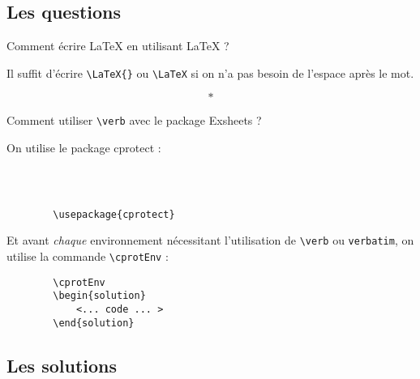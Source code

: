 \documentclass[french,11pt]{report}
\begin{document}
\ReglePied
\entete{}{}{}



\subsection*{Les questions}
\begin{question}
Comment écrire \LaTeX{} en utilisant \LaTeX{} ?
\end{question}

\cprotEnv
\begin{solution}
Il suffit d'écrire \verb=\LaTeX{}= ou \verb!\LaTeX! si on n'a pas besoin de l'espace après le mot.
\end{solution}

\[*\]

\cprotEnv
\begin{question}
    Comment utiliser \verb=\verb= avec le package \textsf{Exsheets} ?
\end{question}

\cprotEnv
\begin{solution}
On utilise le package \textsf{cprotect} :
    \begin{verbatim}
        
        
        
        \usepackage{cprotect}
    \end{verbatim}\smallskip
    
Et avant \textit{chaque} environnement nécessitant l'utilisation de \verb=\verb= ou \verb=verbatim=, on utilise la commande \verb=\cprotEnv= :
    \begin{verbatim}
        \cprotEnv
        \begin{solution}
            <... code ... >
        \end{solution}
    \end{verbatim}
\end{solution}



\subsection*{Les solutions}

\printsolutions
\end{document}

